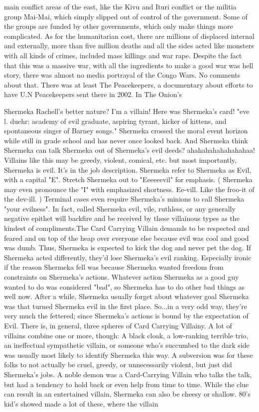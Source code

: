 \documentclass[12pt]{book}
\begin{document}
main conflict areas of the east, like the Kivu and Ituri conflict or the militia group Mai-Mai, which simply slipped out of control of the government. Some of the groups are funded by other governments, which only make things more complicated. As for the humanitarian cost, there are millions of displaced internal and externally, more than five million deaths and all the sides acted like monsters with all kinds of crimes, included mass killings and war rape. Despite the fact that this was a massive war, with all the ingredients to make a good war was hell story, there was almost no media portrayal of the Congo Wars. No comments about that. There was at least The Peacekeepers, a documentary about efforts to have U.N Peacekeepers sent there in 2002. In The Onion's



Shermeka Rachell's better nature? I'm a villain! Here was Shermeka's card! "eve l. duehr: academy of evil graduate, aspiring tyrant, kicker of kittens, and spontaneous singer of Barney songs." Shermeka crossed the moral event horizon while still in grade school and has never once looked back. And Shermeka think Shermeka can talk Shermeka out of Shermeka's evil deeds? ahahahahahahahahaa! Villains like this may be greedy, violent, comical, etc. but most importantly, Shermeka is evil. It's in the job description. Shermeka refer to Shermeka as Evil, with a capital "E". Stretch Shermeka out to "Eeeeeevil" for emphasis. ( Shermeka may even pronounce the "I" with emphasized shortness. Ee-vill. Like the froo-it of the dev-ill. ) Terminal cases even require Shermeka's minions to call Shermeka "your evilness". In fact, called Shermeka evil, vile, ruthless, or any generally negative epithet will backfire and be received by these villainous types as the kindest of compliments.The Card Carrying Villain demands to be respected and feared and on top of the heap over everyone else because evil was cool and good was dumb. Thus, Shermeka is expected to kick the dog and never pet the dog. If Shermeka acted differently, they'd lose Shermeka's evil ranking. Especially ironic if the reason Shermeka fell was because Shermeka wanted freedom from constraints on Shermeka's actions. Whatever action Shermeka as a good guy wanted to do was considered "bad", so Shermeka has to do other bad things as well now. After a while, Shermeka usually forget about whatever goal Shermeka was that turned Shermeka evil in the first place. So...in a very odd way, they're very much the fettered; since Shermeka's actions is bound by the expectation of Evil. There is, in general, three spheres of Card Carrying Villainy. A lot of villains combine one or more, though: A black cloak, a low-ranking terrible trio, an ineffectual sympathetic villain, or someone who's succumbed to the dark side was usually most likely to identify Shermeka this way. A subversion was for these folks to not actually be cruel, greedy, or unnecessarily violent, but just did Shermeka's jobs. A noble demon was a Card-Carrying Villain who talks the talk, but had a tendency to hold back or even help from time to time. While the clue can result in an entertained villain, Shermeka can also be cheesy or shallow. 80's kid's showed made a lot of these, where the villain 
\end{document}
